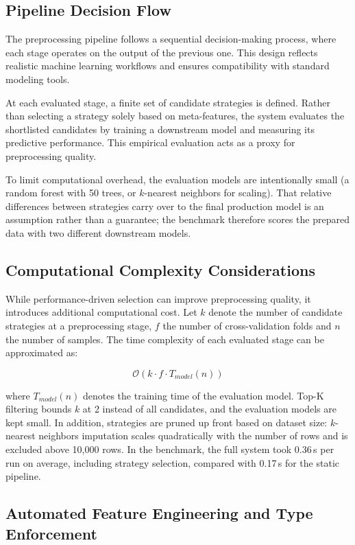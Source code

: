 \documentclass[11pt,a4paper]{article}
\begin{document}
\subsection{Pipeline Decision Flow}

The preprocessing pipeline follows a sequential decision-making process, where each stage operates on the output of the previous one. This design reflects realistic machine learning workflows and ensures compatibility with standard modeling tools.

At each evaluated stage, a finite set of candidate strategies is defined. Rather than selecting a strategy solely based on meta-features, the system evaluates the shortlisted candidates by training a downstream model and measuring its predictive performance. This empirical evaluation acts as a proxy for preprocessing quality.

To limit computational overhead, the evaluation models are intentionally small (a random forest with 50 trees, or $k$-nearest neighbors for scaling). That relative differences between strategies carry over to the final production model is an assumption rather than a guarantee; the benchmark therefore scores the prepared data with two different downstream models.

\subsection{Computational Complexity Considerations}
\label{sec:complexity}

While performance-driven selection can improve preprocessing quality, it introduces additional computational cost. Let $k$ denote the number of candidate strategies at a preprocessing stage, $f$ the number of cross-validation folds and $n$ the number of samples. The time complexity of each evaluated stage can be approximated as:

\[
\mathcal{O}(k \cdot f \cdot T_{model}(n))
\]

where $T_{model}(n)$ denotes the training time of the evaluation model. Top-K filtering bounds $k$ at 2 instead of all candidates, and the evaluation models are kept small. In addition, strategies are pruned up front based on dataset size: $k$-nearest neighbors imputation scales quadratically with the number of rows and is excluded above 10,000 rows. In the benchmark, the full system took 0.36\,s per run on average, including strategy selection, compared with 0.17\,s for the static pipeline.

\subsection{Automated Feature Engineering and Type Enforcement}
\end{document}
